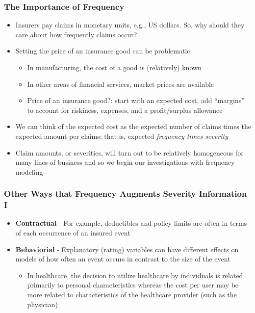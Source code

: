 \documentclass{beamer}
\begin{document}
\begin{frame}
 \frametitle{The Importance of Frequency}
\begin{itemize}
   \item Insurers pay claims in monetary units, e.g., US dollars. So, why should they care about how frequently claims occur? \pause
   \item Setting the price of an insurance good can be problematic:
  \begin{itemize}
\item In manufacturing, the cost of a good is (relatively) known
\item In other areas of financial services, market prices are available
\item Price of an insurance good?: start with an expected cost, add ``margins'' to account for riskiness, expenses, and a profit/surplus allowance
\end{itemize}
\item We can think of the expected cost as the expected number of claims times the expected amount per claims; that is, expected \textit{frequency times severity}
  \item Claim amounts, or severities, will turn out to be relatively homogeneous for many lines of business and so we begin our investigations with frequency modeling
   \end{itemize}
\end{frame}

\begin{frame}%
 \frametitle{Other Ways that Frequency Augments Severity Information I}
\begin{itemize}
     \item \textbf{Contractual} - For example, deductibles and policy limits are often in terms of each occurrence of an insured
     event \vspace{2mm}

     \item \textbf{Behaviorial} - Explanatory (rating) variables can have different effects on models of how often an event occurs in contrast to the size of the event
\begin{itemize}
     \item In healthcare, the decision to utilize healthcare by individuals is related primarily to personal characteristics whereas the cost per user may be more related to characteristics of the healthcare provider (such as the physician)
           \end{itemize}
  \end{itemize}
\end{frame}
\end{document}
